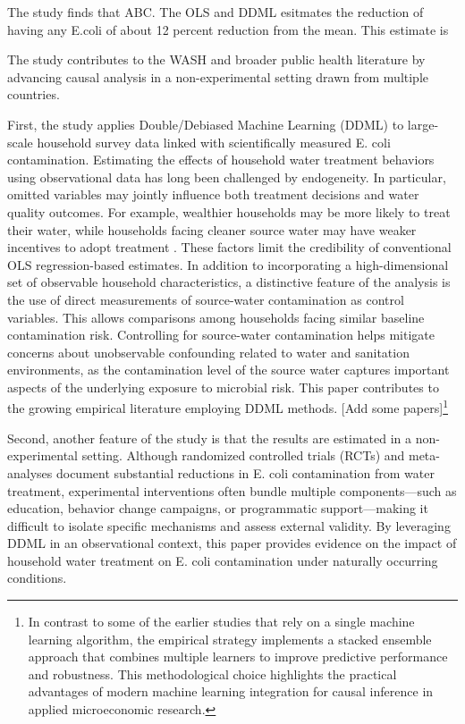 \documentclass [11pt]{article}
\theoremstyle{plain}
\theoremstyle{definition}
\theoremstyle{remark}
\newcommand{\1}{\bm{1}}
\begin{document}
The study finds that ABC. 
The OLS and DDML esitmates the reduction of having any E.coli of about 12 percent reduction from the mean. This estimate is 

The study contributes to the WASH and broader public health literature by advancing causal analysis in a non-experimental setting drawn from multiple countries.

First, the study applies Double/Debiased Machine Learning (DDML) to large-scale household survey data linked with scientifically measured E. coli contamination. Estimating the effects of household water treatment behaviors using observational data has long been challenged by endogeneity. In particular, omitted variables may jointly influence both treatment decisions and water quality outcomes. For example, wealthier households may be more likely to treat their water, while households facing cleaner source water may have weaker incentives to adopt treatment \citep{kamei2026water}. These factors limit the credibility of conventional OLS regression-based estimates. In addition to incorporating a high-dimensional set of observable household characteristics, a distinctive feature of the analysis is the use of direct measurements of source-water contamination as control variables. This allows comparisons among households facing similar baseline contamination risk. Controlling for source-water contamination helps mitigate concerns about unobservable confounding related to water and sanitation environments, as the contamination level of the source water captures important aspects of the underlying exposure to microbial risk. This paper contributes to the growing empirical literature employing DDML methods. [Add some papers]\footnote{In contrast to some of the earlier studies that rely on a single machine learning algorithm, the empirical strategy implements a stacked ensemble approach that combines multiple learners to improve predictive performance and robustness. This methodological choice highlights the practical advantages of modern machine learning integration for causal inference in applied microeconomic research.}

Second, another feature of the study is that the results are estimated in a non-experimental setting. Although randomized controlled trials (RCTs) and meta-analyses document substantial reductions in E. coli contamination from water treatment, experimental interventions often bundle multiple components—such as education, behavior change campaigns, or programmatic support—making it difficult to isolate specific mechanisms and assess external validity. By leveraging DDML in an observational context, this paper provides evidence on the impact of household water treatment on E. coli contamination under naturally occurring conditions.
\end{document}
